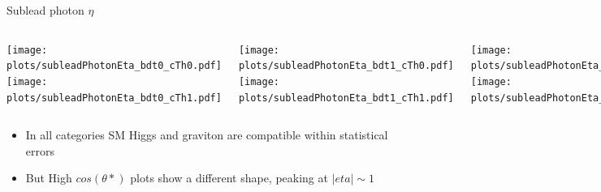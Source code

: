 \documentclass[8pt]{beamer}
\begin{document}
\begin{frame}{Sublead photon $\eta$}

  \begin{block}
   
     \begin{columns}
     
      \centering
     
      \column[t]{3.0cm}
      \texttt{[image: plots/subleadPhotonEta\_bdt0\_cTh0.pdf]} \\
      \texttt{[image: plots/subleadPhotonEta\_bdt0\_cTh1.pdf]} 
      
      \column[t]{3.0cm}
      \texttt{[image: plots/subleadPhotonEta\_bdt1\_cTh0.pdf]} \\
      \texttt{[image: plots/subleadPhotonEta\_bdt1\_cTh1.pdf]}
      
      \column[t]{3.0cm}
      \texttt{[image: plots/subleadPhotonEta\_bdt2\_cTh0.pdf]} \\
      \texttt{[image: plots/subleadPhotonEta\_bdt2\_cTh1.pdf]}
      
      \column[t]{3.0cm}
      \texttt{[image: plots/subleadPhotonEta\_bdt3\_cTh0.pdf]} \\
      \texttt{[image: plots/subleadPhotonEta\_bdt3\_cTh1.pdf]}
      
    \end{columns}
  
  \end{block}

  \begin{itemize}
    \item In all categories SM Higgs and graviton are compatible within statistical errors
    \item But High $cos(\theta *)$ plots show a different shape, peaking at $|eta| \sim 1$
  \end{itemize}
  
\end{frame}
\end{document}
